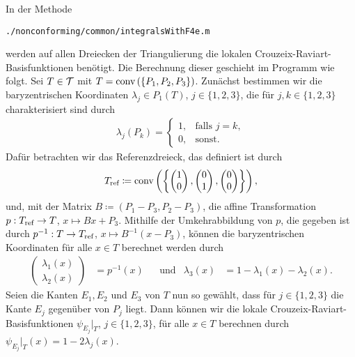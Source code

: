 In der Methode
\begin{center}
  \texttt{./nonconforming/common/integralsWithF4e.m}
\end{center}
werden auf allen Dreiecken der Triangulierung die lokalen
Crouzeix-Raviart-Basis\-funk\-tio\-nen benötigt. Die Berechnung dieser geschieht 
im Programm wie folgt.
Sei $T\in\mathcal{T}$ mit $T=\textup{conv}\left(\{P_1,P_2,P_3\}\right)$. Zunächst bestimmen
wir die baryzentrischen Koordinaten $\lambda_j\in P_1(T)$, $j\in\{1,2,3\}$,
die für $j,k\in\{1,2,3\}$ charakterisiert sind durch
\begin{align*}
  \lambda_j(P_k)
  =
  \begin{cases}
    1,&\text{falls }  j=k,\\
    0,&\text{sonst.}
  \end{cases}
\end{align*}
Dafür betrachten wir das Referenzdreieck, das 
definiert ist durch
\begin{align*}
  T_\textup{ref} \coloneqq
  \textup{conv}\left(\left\{
  \begin{pmatrix}
   1\\0 
  \end{pmatrix},
  \begin{pmatrix}
   0\\1 
  \end{pmatrix},
  \begin{pmatrix}
   0\\0 
  \end{pmatrix}
  \right\}\right),
\end{align*}
und, mit der Matrix $B\coloneqq (P_1-P_3,P_2-P_3)$, die affine Transformation
$p:T_\textup{ref} \to T$, $x \mapsto Bx+P_3$. 
Mithilfe der Umkehrabbildung von $p$, die gegeben ist durch $p^{-1}:T\to T_\textup{ref}$,
$x\mapsto B^{-1}(x-P_3)$, können die baryzentrischen Koordinaten für alle $x\in
T$ berechnet werden durch 
\begin{align*}
  \begin{pmatrix}
    \lambda_1(x)\\
    \lambda_2(x)
  \end{pmatrix}
  &=
  p^{-1}(x) &&\text{und}
  &\lambda_3(x)
  &=1-\lambda_1(x)-\lambda_2(x).
\end{align*}
Seien die Kanten $E_1,E_2$ und $E_3$ von $T$ nun so gewählt, dass für
$j\in\{1,2,3\}$ die Kante $E_j$ gegenüber von $P_j$ liegt. 
Dann können wir die lokale Crouzeix-Raviart-Basisfunktionen 
$\psi_{E_j}\!|_T$, $j\in\{1,2,3\}$, für alle $x\in T$ berechnen durch
$\psi_{E_j}\!|_T(x)=1-2\lambda_j(x)$.


